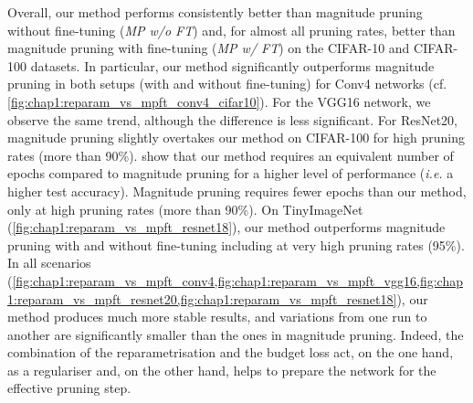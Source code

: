 Overall, our method performs consistently better than magnitude pruning without
fine-tuning (\emph{MP w/o FT}) and, for almost all pruning rates, better than
magnitude pruning with fine-tuning (\emph{MP w/ FT}) on the CIFAR-10 and CIFAR-100
datasets. In particular, our method significantly outperforms magnitude pruning
in both setups (with and without fine-tuning) for Conv4 networks (cf.
\cref{fig:chap1:reparam_vs_mpft_conv4_cifar10}). For the VGG16 network, we
observe the same trend, although the difference is less significant. For
ResNet20, magnitude pruning slightly overtakes our method on CIFAR-100 for
high pruning rates (more than 90\%).
show that our method requires an equivalent number of epochs compared to
magnitude pruning for a higher level of performance (\textit{i.e.} a higher test
accuracy). Magnitude pruning requires fewer epochs than our method, only at high
pruning rates (more than 90\%). On TinyImageNet
(\cref{fig:chap1:reparam_vs_mpft_resnet18}), our method outperforms magnitude
pruning with and without fine-tuning including at very high pruning rates
(95\%). In all scenarios
(\cref{fig:chap1:reparam_vs_mpft_conv4,fig:chap1:reparam_vs_mpft_vgg16,fig:chap1:reparam_vs_mpft_resnet20,fig:chap1:reparam_vs_mpft_resnet18}),
our method produces much more stable results, and variations from one run to
another are significantly smaller than the ones in magnitude pruning. Indeed,
the combination of the reparametrisation and the budget loss act, on the one
hand, as a regulariser and, on the other hand, helps to prepare the network for
the effective pruning step.\\

